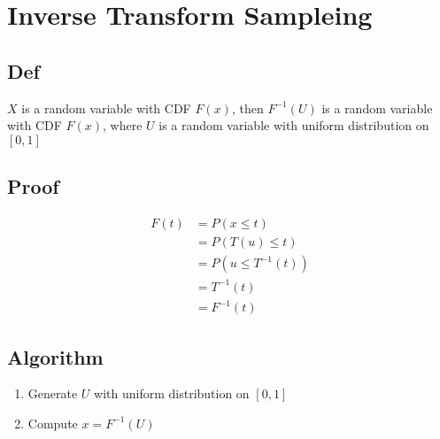 \section{Inverse Transform Sampleing}
    \subsection*{Def}
        $X$ is a random variable with CDF $F(x)$, then $F^{-1}(U)$ is a random variable with CDF $F(x)$, where $U$ is a random variable with uniform distribution on $[0,1]$
    
    \subsection*{Proof}
        \begin{equation*}
            \begin{aligned}
                F(t) &= P(x\leq t) \\
                &= P(T(u) \leq t) \\
                &= P(u \leq T^{-1}(t)) \\
                &= T^{-1}(t)\\
                &= F^{-1}(t)
            \end{aligned}
        \end{equation*}
    
        \subsection*{Algorithm}
        \begin{enumerate}
            \item Generate $U$ with uniform distribution on $[0,1]$
            \item Compute $x = F^{-1}(U)$
        \end{enumerate}
    